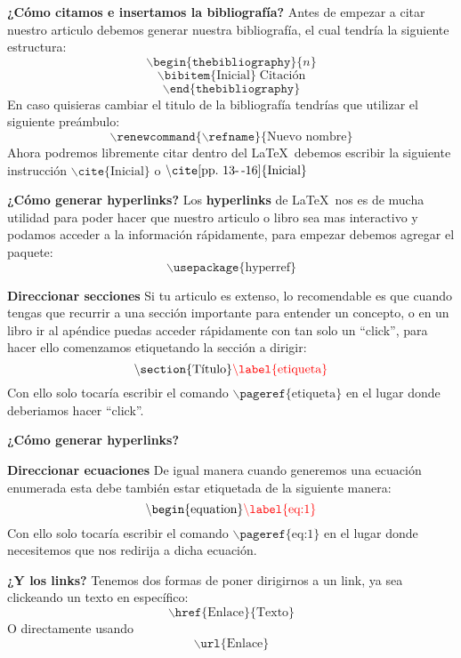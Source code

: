 \documentclass[aspectratio=169]{beamer}
\begin{document}
\begin{frame}{\bf ¿Cómo citamos e insertamos la bibliografía?}
Antes de empezar a citar nuestro articulo debemos generar nuestra bibliografía, el cual tendría la siguiente estructura:
$$\backslash\texttt{begin}\{\texttt{thebibliography}\}\{n\}$$
$$\backslash\texttt{bibitem}\{\text{Inicial}\}\;\text{Citación}$$
$$\backslash\texttt{end}\{\texttt{thebibliography}\}$$
En caso quisieras cambiar el titulo de la bibliografía tendrías que utilizar el siguiente preámbulo:
$$\backslash\texttt{renewcommand}\{\backslash\texttt{refname}\}\{\text{Nuevo nombre}\}$$
Ahora podremos libremente citar dentro del \LaTeX\ debemos escribir la siguiente instrucción $\backslash\texttt{cite}\{\text{Inicial}\}$ o $\backslash\texttt{cite}[\text{pp.\ 13-\,-16}]\{\text{Inicial}\}$
\end{frame}

\begin{frame}{\bf ¿Cómo generar hyperlinks?}
Los \textbf{hyperlinks} de \LaTeX\ nos es de mucha utilidad para poder hacer que nuestro articulo o libro sea mas interactivo y podamos acceder a la información rápidamente, para empezar debemos agregar el paquete:
$$\backslash\texttt{usepackage}\{\text{hyperref}\}$$
\begin{alertblock}{\bf Direccionar secciones}
Si tu articulo es extenso, lo recomendable es que cuando tengas que recurrir a una sección importante para entender un concepto, o en un libro ir al apéndice puedas acceder rápidamente con tan solo un ``click'', para hacer ello comenzamos etiquetando la sección a dirigir:
$$\backslash\texttt{section}\{\text{Título}\}\color{red}\backslash\texttt{label}\{\text{etiqueta}\}$$
Con ello solo tocaría escribir el comando $\backslash\texttt{pageref}\{\text{etiqueta}\}$ en el lugar donde deberiamos hacer ``click''.
\end{alertblock}
\end{frame}

\begin{frame}{\bf ¿Cómo generar hyperlinks?}
\begin{alertblock}{\bf Direccionar ecuaciones}
De igual manera cuando generemos una ecuación enumerada esta debe también estar etiquetada de la siguiente manera:
$$\backslash\texttt{begin}\{\text{equation}\}\color{red}\backslash\texttt{label}\{\text{eq:1}\}$$
Con ello solo tocaría escribir el comando $\backslash\texttt{pageref}\{\text{eq:1}\}$ en el lugar donde necesitemos que nos redirija a dicha ecuación.
\end{alertblock}

\begin{alertblock}{\bf ¿Y los links?}
Tenemos dos formas de poner dirigirnos a un link, ya sea clickeando un texto en específico:
$$\backslash\texttt{href}\{\text{Enlace}\}\{\text{Texto}\}$$
O directamente usando $$\backslash\texttt{url}\{\text{Enlace}\}$$
\end{alertblock}
\end{frame}
\end{document}
